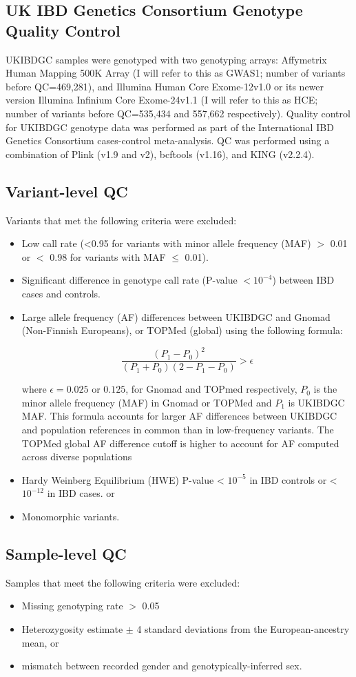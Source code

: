 \subsection{UK IBD Genetics Consortium Genotype Quality Control}
UKIBDGC samples were genotyped with two genotyping arrays: Affymetrix Human Mapping 500K Array (I will refer to this as GWAS1; number of variants before QC=469,281), and Illumina Human Core Exome-12v1.0 or its newer version Illumina Infinium Core Exome-24v1.1 (I will refer to this as HCE; number of variants before QC=535,434 and 557,662 respectively). Quality control for UKIBDGC genotype data was performed as part of the International IBD Genetics Consortium cases-control meta-analysis. QC was performed using a combination of Plink (v1.9 and v2), bcftools (v1.16), and KING (v2.2.4).
\subsection{Variant-level QC}
Variants that met the following criteria were excluded: 
\begin{itemize}
  \item Low call rate (<0.95 for variants with minor allele frequency (MAF) $>$ 0.01 or $<$ 0.98 for variants with MAF $\leq$ 0.01).
  \item Significant difference in genotype call rate (P-value $< 10^{-4}$) between IBD cases and controls.
  \item Large allele frequency (AF) differences between UKIBDGC and Gnomad (Non-Finnish Europeans), or TOPMed (global) using the following formula:

$$\frac{(P_{1}-P_{0})^{2}}{(P_{1}+P_{0})(2-P_{1}-P_{0})} > \epsilon$$ 


where $\epsilon=0.025$ or $0.125$, for Gnomad and TOPmed respectively,  $P_{0}$ is the minor allele frequency (MAF) in Gnomad or TOPMed and $P_{1}$ is UKIBDGC MAF. This formula accounts for larger AF differences between UKIBDGC and population references in common than in low-frequency variants. The TOPMed global AF difference cutoff is higher to account for AF computed across diverse populations
\item Hardy Weinberg Equilibrium (HWE) P-value < $10^{-5}$ in IBD controls or < $10^{-12}$ in IBD cases.
 or 
\item Monomorphic variants. 
\end{itemize}

\subsection{Sample-level QC}
Samples that meet the following criteria were excluded:
\begin{itemize}
\item Missing genotyping rate $>$ 0.05
\item Heterozygosity estimate $\pm$ 4 standard deviations from the European-ancestry mean, or 
\item mismatch between recorded gender and genotypically-inferred sex. 
\end{itemize}
